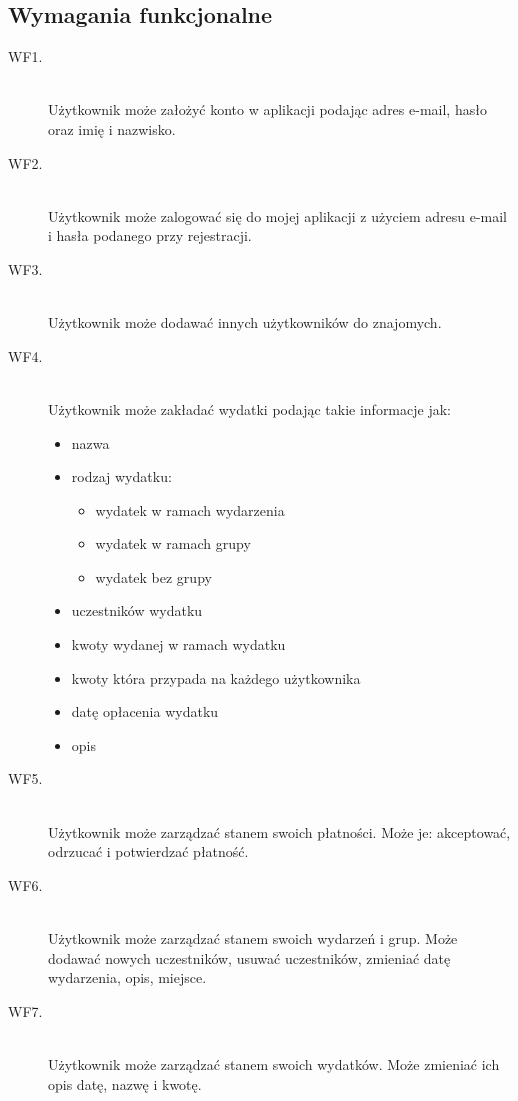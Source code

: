\subsection{Wymagania funkcjonalne}
\begin{description}
  \item[WF1.] \hfill \\ Użytkownik może założyć konto w aplikacji podając adres e-mail, hasło oraz imię i nazwisko.
  \item[WF2.] \hfill \\ Użytkownik może zalogować się do mojej aplikacji z użyciem adresu e-mail i hasła podanego przy rejestracji.
  \item[WF3.] \hfill \\ Użytkownik może dodawać innych użytkowników do znajomych.
  \item[WF4.] \hfill \\ Użytkownik może zakładać wydatki podając takie informacje jak:
    \begin{itemize}
      \item nazwa
      \item rodzaj wydatku: 
        \begin{itemize}
          \item wydatek w ramach wydarzenia
          \item wydatek w ramach grupy
          \item wydatek bez grupy
        \end{itemize}
      \item uczestników wydatku
      \item kwoty wydanej w ramach wydatku
      \item kwoty która przypada na każdego użytkownika
      \item datę opłacenia wydatku
      \item opis
    \end{itemize}
  \item[WF5.] \hfill \\ Użytkownik może zarządzać stanem swoich płatności. Może je: akceptować, odrzucać i potwierdzać płatność.
  \item[WF6.] \hfill \\ Użytkownik może zarządzać stanem swoich wydarzeń i grup. Może dodawać nowych uczestników, usuwać uczestników, zmieniać datę wydarzenia, opis, miejsce.
  \item[WF7.] \hfill \\ Użytkownik może zarządzać stanem swoich wydatków. Może zmieniać ich opis datę, nazwę i kwotę.

\end{description}
